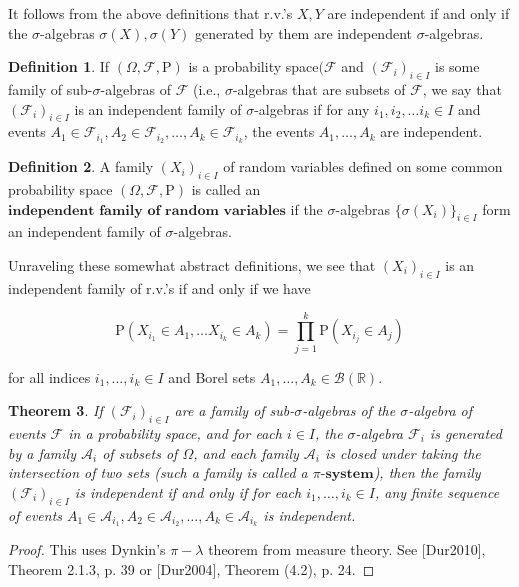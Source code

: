 \documentclass[11pt]{report}
\providecommand{\cal}{\mathcal}
\newcommand{\R}{\mathbb{R}}
\theoremstyle{plain}
\newtheorem{thm}{Theorem}[chapter]
\theoremstyle{definition}
\newtheorem{defn}[thm]{Definition}
\begin{document}
\noindent It follows from the above definitions that r.v.'s
$X,Y$ are independent if and only if the
$\sigma$-algebras $\sigma(X), \sigma(Y)$ generated by
them are independent $\sigma$-algebras.

\begin{defn}
If $(\Omega, {\cal F}, \mathrm{P})$ is a probability
space$({\cal F}$ and $({\cal F}_i)_{i\in I}$ is some
family of sub-$\sigma$-algebras of ${\cal F}$ (i.e.,
$\sigma$-algebras that are subsets of ${\cal F}$, we
say that $({\cal F}_i)_{i\in I}$ is an independent
family of $\sigma$-algebras if for any
$i_1,i_2,\ldots i_k\in I$ and events
$A_1 \in {\cal F}_{i_1}, A_2 \in {\cal F}_{i_2},
\ldots, A_k \in {\cal F}_{i_k}$,
the events $A_1,\ldots,A_k$ are independent.
\end{defn}

\begin{defn}
A family $(X_i)_{i\in I}$ of random variables defined
on some common probability space
$(\Omega, {\cal F}, \mathrm{P})$ is called an
$\textbf{independent family of random variables}$ if
the $\sigma$-algebras $\{ \sigma(X_i) \}_{i\in I}$
form an independent family of $\sigma$-algebras.
\end{defn}

\noindent Unraveling these somewhat abstract definitions, we
see that $(X_i)_{i\in I}$ is an independent family of
r.v.'s if and only if we have

\[
\mathrm{P}(X_{i_1} \in A_1, \ldots X_{i_k} \in A_k) = \prod_{j=1}^k \mathrm{P}(X_{i_j} \in A_j)
\]

\noindent for all indices $i_1,\ldots,i_k \in I$ and Borel sets
$A_1,\ldots, A_k \in {\cal B}(\R)$.

\begin{thm}
If $({\cal F}_i)_{i\in I}$ are a family of
sub-$\sigma$-algebras of the $\sigma$-algebra of
events ${\cal F}$ in a probability space, and for
each $i\in I$, the $\sigma$-algebra ${\cal F}_i$ is
generated by a family ${\cal A}_i$ of subsets of
$\Omega$, and each family ${\cal A}_i$ is closed
under taking the intersection of two sets (such a
family is called a $\textbf{$\pi$-system}$), then the
family $({\cal F}_i)_{i\in I}$ is independent if and
only if for each $i_1,\ldots,i_k\in I$, any finite
sequence of events
$A_1 \in {\cal A}_{i_1}, A_2\in {\cal A}_{i_2},
\ldots, A_k \in {\cal A}_{i_k}$
is independent.
\end{thm}

\begin{proof}
This uses Dynkin's $\pi-\lambda$ theorem from measure
theory. See [Dur2010], Theorem 2.1.3, p. 39 or
[Dur2004], Theorem (4.2), p. 24.
\end{proof}
\end{document}
